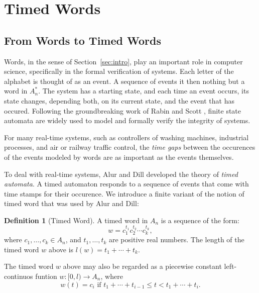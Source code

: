 \documentclass[10pt]{amsproc}
\theoremstyle{definition}
\newtheorem{definition}[theorem]{Definition}
\theoremstyle{remark}
\begin{document}
\section{Timed Words}
\subsection{From Words to Timed Words}
\label{sec:words-to-timed-words}
Words, in the sense of Section~\ref{sec:intro}, play an important role in computer science, specifically in the formal verification of systems.
Each letter of the alphabet is thought of as an event.
A sequence of events it then nothing but a word in $A_n^*$.
The system has a starting state, and each time an event occurs, its state changes, depending both, on its current state, and the event that has occured.
Following the groundbreaking work of Rabin and Scott \cite{rabin1959finite}, finite state automata are widely used to model and formally verify the integrity of systems.

For many real-time systems, such as controllers of washing machines, industrial processes, and air or railway traffic control, the \emph{time gaps} between the occurences of the events modeled by words are as important as the events themselves.

To deal with real-time systems, Alur and Dill \cite{alur-dill} developed the theory of \emph{timed automata}.
A timed automaton responds to a sequence of events that come with time stamps for their occurence.
We introduce a finite variant of the notion of timed word that was used by Alur and Dill:
\begin{definition}
  [Timed Word]
  \label{definition:timed-word}
  A timed word in $A_n$ is a sequence of the form:
  \begin{displaymath}
    w=c_1^{t_1} c_2^{t_2}\dotsb c_k^{t_k},
  \end{displaymath}
  where $c_1,\dotsc,c_k\in A_n$, and $t_1,\dotsc,t_k$ are positive real numbers.
  The length of the timed word $w$ above is $l(w)=t_1+\dotsb+t_k$.
\end{definition}
The timed word $w$ above may also be regarded as a piecewise constant left-continuos funtion $w:[0,l)\to A_n$, where
\begin{displaymath}
  w(t) = c_i \text{ if } t_1+\dotsb+t_{i-1}\leq t < t_1+\dotsb + t_i.
\end{displaymath}
\label{sec:timed-words}


\end{document}
